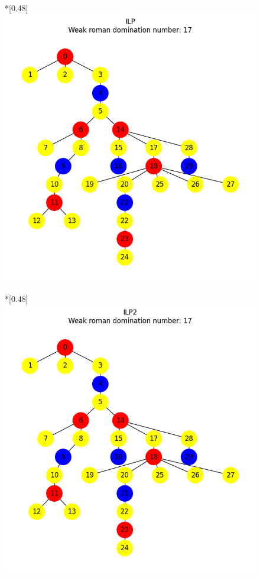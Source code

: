     \begin{figure}[htbp]
        \centering
        \begin{subcaptionbox}*{}[0.48\linewidth]
            {\includegraphics[width=0.75\linewidth]{assets/plots/ILP/RandomTree_n30_i2_results.png}}
        \end{subcaptionbox}
        \hfill
        \begin{subcaptionbox}*{}[0.48\linewidth]
            {\includegraphics[width=0.75\linewidth]{assets/plots/ILP2/RandomTree_n30_i2_results.png}}
        \end{subcaptionbox}
        \hfill

\end{figure}
